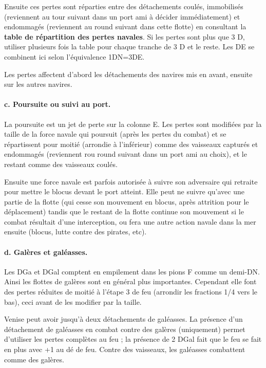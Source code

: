 Ensuite ces pertes sont réparties entre des détachements coulés,
immobilisés (reviennent au tour suivant dans un port ami à
décider immédiatement) et endommagés (reviennent au round suivant dans cette
flotte) en consultant la \textbf{table de répartition des pertes navales}.
Si les pertes sont plus que 3 D, utiliser plusieurs fois la table pour chaque
tranche de 3 D et le reste. 
Les DE se combinent ici selon l'équivalence 1DN=3DE. 

Les pertes affectent d'abord les détachements des navires mis en avant,
ensuite sur les autres navires.


\paragraph{c. Poursuite ou suivi au port.} La poursuite est un jet de perte
sur la colonne E. Les pertes sont modifiées par la taille de la force navale
qui poursuit (après les pertes du combat) et se répartissent pour moitié (arrondie
à l'inférieur) comme des vaisseaux capturés et endommagés (reviennent rou
round suivant dans un port ami au choix), et le restant comme des vaisseaux
coulés.

Ensuite une force navale est parfois autorisée à suivre son adversaire qui
retraite pour mettre le blocus devant le port atteint. Elle peut ne suivre qu'avec
une partie de la flotte (qui cesse son mouvement en blocus, après attrition
pour le déplacement) tandis que le restant de la flotte continue son
mouvement si le combat résultait d'une interception, ou fera une autre
action navale dans la mer ensuite (blocus, lutte contre des pirates, etc).

\paragraph{d. Galères et galéasses.} Les DGa et DGal comptent en empilement
dans les pions F comme un demi-DN. Ainsi les flottes de galères sont en général
plus importantes. Cependant elle font des pertes réduites de moitié à l'étape 3
de feu (arrondir les fractions 1/4 vers le bas), ceci avant de les modifier par la taille.

Venise peut avoir jusqu'à deux détachements de galéasses. La présence
d'un détachement de galéasses en combat contre des galères (uniquement) permet d'utiliser 
les pertes complètes au feu ; la présence de 2 DGal fait que le feu se fait
en plus avec +1 au dé de feu.
Contre des vaisseaux, les galéasses combattent comme des galères.

